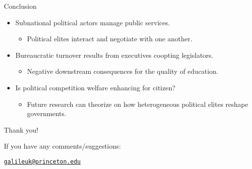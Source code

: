 \documentclass[ignorenonframetext,]{beamer}
\providecommand{\tightlist}{%
  \setlength{\itemsep}{0pt}\setlength{\parskip}{0pt}}
\begin{document}
\begin{frame}{Conclusion}
\protect\hypertarget{conclusion-1}{}

\begin{itemize}
\tightlist
\item
  Subnational political actors manage public services.

  \begin{itemize}
  \tightlist
  \item
    Political elites interact and negotiate with one another.
  \end{itemize}
\item
  Bureaucratic turnover results from executives coopting legislators.

  \begin{itemize}
  \tightlist
  \item
    Negative downstream consequences for the quality of education.
  \end{itemize}
\item
  Is political competition welfare enhancing for citizen?

  \begin{itemize}
  \tightlist
  \item
    Future research can theorize on how heterogeneous political elites
    reshape governments.
  \end{itemize}
\end{itemize}

\end{frame}

\begin{frame}{Thank you!}
\protect\hypertarget{thank-you}{}

If you have any comments/suggestions:

\selectfont \href{mailto:galileuk@princeton.edu}{\nolinkurl{galileuk@princeton.edu}}

\appendix

\end{frame}
\end{document}
